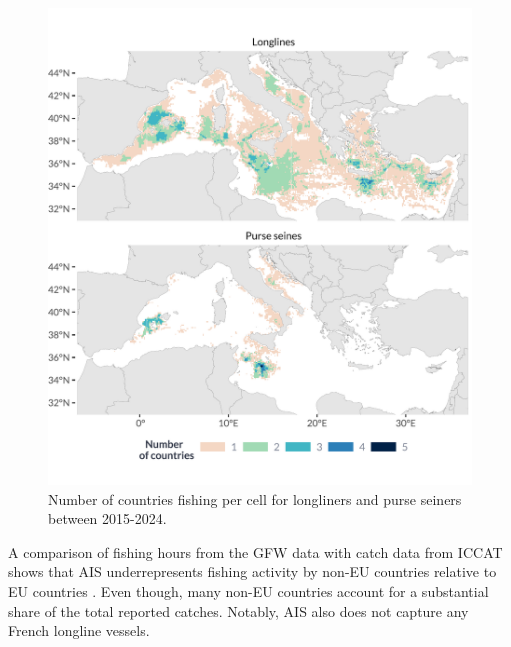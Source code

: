 \begin{figure}[H]
    \centering
    \includegraphics[width=1\linewidth, trim=0 1.2cm 0 1.2cm,clip]{Figures/plots/no_countries.pdf}
    \caption{Number of countries fishing per cell for longliners and purse seiners between 2015-2024.}
    \label{fig:no_countries}
\end{figure}

A comparison of fishing hours from the GFW data with catch data from ICCAT shows that AIS underrepresents fishing activity by non-EU countries relative to EU countries
. Even though, many non-EU countries account for a substantial share of the total reported catches. Notably, AIS also does not capture any French
longline vessels.

